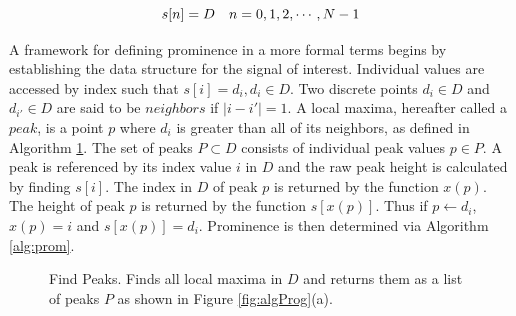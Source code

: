 \begin{equation}
  \label{eqn:sig}
  \hfill s[n]=D \quad n=0,1,2,\cdots,N-1 \hfill
\end{equation}

A framework for defining prominence in a more formal terms begins by establishing the data structure for the signal of interest. Individual values are accessed by index such that $s[i]=d_i, d_i\in D$. Two discrete points $d_i \in D$ and $d_{i'} \in D$ are said to be $neighbors$ if $|i-i'| = 1$. A local maxima, hereafter called a $peak$, is a point $p$ where $d_i$ is greater than all of its neighbors, as defined in Algorithm \ref{alg:peaks}. The set of peaks $P \subset D$ consists of individual peak values $p \in P$. A peak is referenced by its index value $i$ in $D$ and the raw peak height is calculated by finding $s[i]$. The index in $D$ of peak $p$ is returned by the function $x(p)$. The height of peak $p$ is returned by the function $s[x(p)]$. Thus if $p \leftarrow d_i$, $x(p)=i$ and $s[x(p)]=d_i$. Prominence is then determined via Algorithm \ref{alg:prom}. 


\begin{figure}
\begin{algorithm}[H]
\DontPrintSemicolon
{}
\caption{Find Peaks. Finds all local maxima in $D$ and returns them as a list of peaks $P$ as shown in Figure \ref{fig:algProg}(a). \label{alg:peaks}}
\end{algorithm}
\end{figure}


